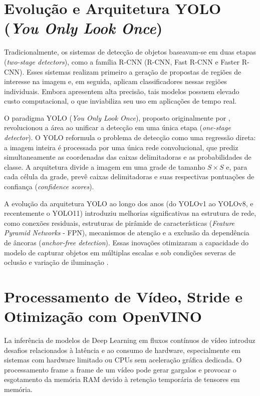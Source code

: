 \section{Evolução e Arquitetura YOLO (\textit{You Only Look Once})}
Tradicionalmente, os sistemas de detecção de objetos baseavam-se em duas etapas (\textit{two-stage detectors}), como a família R-CNN (R-CNN, Fast R-CNN e Faster R-CNN). Esses sistemas realizam primeiro a geração de propostas de regiões de interesse na imagem e, em seguida, aplicam classificadores nessas regiões individuais. Embora apresentem alta precisão, tais modelos possuem elevado custo computacional, o que inviabiliza seu uso em aplicações de tempo real.

O paradigma YOLO (\textit{You Only Look Once}), proposto originalmente por , revolucionou a área ao unificar a detecção em uma única etapa (\textit{one-stage detector}). O YOLO reformula o problema de detecção como uma regressão direta: a imagem inteira é processada por uma única rede convolucional, que prediz simultaneamente as coordenadas das caixas delimitadoras e as probabilidades de classe. A arquitetura divide a imagem em uma grade de tamanho $S \times S$ e, para cada célula da grade, prevê caixas delimitadoras e suas respectivas pontuações de confiança (\textit{confidence scores}).

A evolução da arquitetura YOLO ao longo dos anos (do YOLOv1 ao YOLOv8, e recentemente o YOLO11) introduziu melhorias significativas na estrutura de rede, como conexões residuais, estruturas de pirâmide de características (\textit{Feature Pyramid Networks} - FPN), mecanismos de atenção e a exclusão da dependência de âncoras (\textit{anchor-free detection}). Essas inovações otimizaram a capacidade do modelo de capturar objetos em múltiplas escalas e sob condições severas de oclusão e variação de iluminação \cite{terven2023comprehensive, ultralytics2026}.

\section{Processamento de Vídeo, Stride e Otimização com OpenVINO}
La inferência de modelos de Deep Learning em fluxos contínuos de vídeo introduz desafios relacionados à latência e ao consumo de hardware, especialmente em sistemas com hardware limitado ou CPUs sem aceleração gráfica dedicada. O processamento frame a frame de um vídeo pode gerar gargalos e provocar o esgotamento da memória RAM devido à retenção temporária de tensores em memória.

